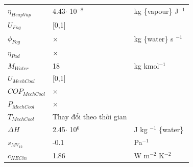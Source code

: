 \documentclass[a4paper]{article}
\begin{document}
\begin{longtable}{l p{} l }
$\eta_{HeapVap}$			& 4.43$\cdot$ 10$^{-8}$	& kg \{vapour\} J$^{-1}$				\\
$U_{Fog}$					& [0,1]					& \\
$\phi_{Fog}$				& $\times$				& kg \{water\} s $^{-1}$\\
$\eta_{Pad}$				& $\times$				&									\\
$M_{Water}$					& 18					& kg kmol$^{-1}$ 					\\
$U_{MechCool}$				& [0,1]					&                                   \\
$COP_{MechCool}$			& $\times$				&                                   \\
$P_{MechCool}$				& $\times$				&                                   \\
$T_{MechCool}$				&Thay đổi theo thời gian&                                   \\
$\Delta H$					& 2.45$\cdot$ 10$^6$	& J kg $^{-1}$ \{water\}            \\
$s_{MV_{12}}$               &-0.1                   & Pa$^{-1}$\\
$c_{HECin}$					& 1.86					& W m$^{-2}$ K$^{-2}$               \\

\end{longtable}
\end{document}
